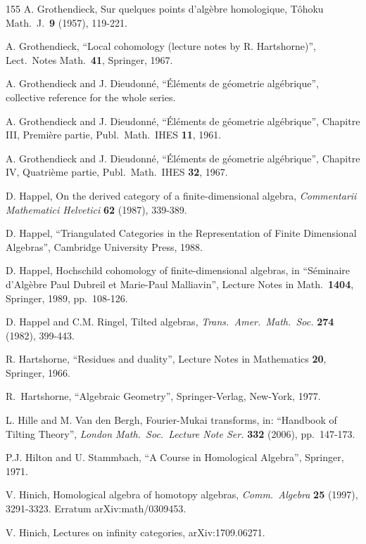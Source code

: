 \begin{thebibliography}{155}
 A. Grothendieck, 
Sur quelques points d'alg\`ebre homologique, T\^ohoku Math.\ J.\ {\bf 9}
(1957), 119-221.

 A. Grothendieck, 
``Local cohomology (lecture notes by R. Hartshorne)'', 
Lect.\ Notes Math.\ {\bf 41}, Springer, 1967.

 A. Grothendieck and J. Dieudonn\'e, 
``\'El\'ements de g\'eometrie alg\'ebrique'', collective reference for the 
whole series. 

 A. Grothendieck and J. Dieudonn\'e, 
``\'El\'ements de g\'eometrie alg\'ebrique'', 
Chapitre III, Premi\`ere partie,
Publ.\ Math.\ IHES {\bf 11}, 1961.

 A. Grothendieck and J. Dieudonn\'e,
``\'El\'ements de g\'eometrie alg\'ebrique'', 
Chapitre IV, Quatri\`eme partie,
Publ.\ Math.\ IHES {\bf 32}, 1967. 

 D. Happel,
On the derived category of a finite-dimensional algebra,
{\em Commentarii Mathematici Helvetici} {\bf 62} (1987), 339-389.

 D. Happel,
``Triangulated Categories in the Representation of Finite Dimensional 
Algebras'', Cambridge University Press, 1988.

 D. Happel,
Hochschild cohomology of finite-dimensional algebras, 
in ``S\'eminaire d'Alg\`ebre Paul Dubreil et Marie-Paul Malliavin'',
Lecture Notes in Math.\ {\bf 1404}, Springer, 1989, pp.\ 108-126.

 D. Happel and C.M. Ringel, 
Tilted algebras, 
{\em Trans.\ Amer.\ Math.\ Soc.} {\bf 274} (1982), 399-443.

 R. Hartshorne, ``Residues and duality'', 
Lecture Notes in Mathematics {\bf 20}, Springer, 1966.

 R.\ Hartshorne, ``Algebraic Geometry'',
        Springer-Verlag, New-York, 1977.

 L. Hille and M. Van den Bergh,
Fourier-Mukai transforms,
in: ``Handbook of Tilting Theory'', 
{\em London Math.\ Soc.\ Lecture Note Ser.} {\bf 332} (2006), pp.\ 147-173.

 P.J. Hilton and U. Stammbach, 
``A Course in Homological Algebra'',
Springer, 1971.

 V. Hinich,
Homological algebra of homotopy algebras,
{\em Comm.\ Algebra} {\bf 25} (1997), 3291-3323.
Erratum	arXiv:math/0309453. 

 V. Hinich,
Lectures on infinity categories, 
arXiv:1709.06271. 


\end{thebibliography}
